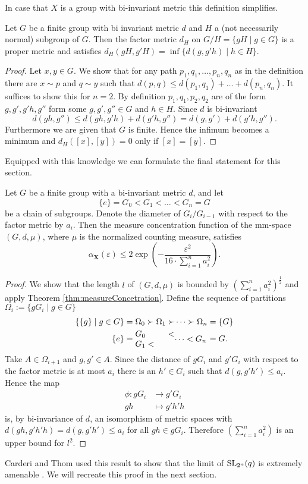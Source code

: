 In case that $X$ is a group with bi-invariant metric this definition simplifies.
\begin{lemma}\label{lem:factorMetric}
Let $G$ be a finite group with bi invariant metric $d$ and $H$ a (not necessarily normal) subgroup of $G$. Then the factor metric $d_H$ on $G/H=\{gH\mid g\in G\}$ is a proper metric and satisfies $d_H(gH,g'H)=\inf\{d(g,g'h)\mid h\in H\}$.
\end{lemma}
\begin{proof}
Let $x,y\in G$. We show that for any path $p_1,q_1,\dots,p_n,q_n$ as in the definition there are $x\sim p$ and $q\sim y$ such that $d(p,q)\leq d(p_1,q_1)+\dots+d(p_n,q_n)$. It suffices to show this for $n=2$. 
By definition $p_1,q_1,p_2,q_2$ are of the form $g,g',g'h,g''$ form some $g,g',g''\in G$ and $h\in H$. Since $d$ is bi-invariant 
\[d(gh,g'')\leq d(gh,g'h)+d(g'h,g'')=d(g,g')+d(g'h,g'').\]
Furthermore we are given that $G$ is finite. Hence the infimum becomes a minimum and $d_H([x],[y])=0$ only if $[x]=[y]$.
\end{proof}

Equipped with this knowledge we can formulate the final statement for this section. 
\begin{corollary}\label{cor:meaContractionGroups}
Let $G$ be a finite group with a bi-invariant metric $d$, and let
\[\{e\}=G_0<G_1<\dots <G_n=G\]
be a chain of subgroups. Denote the diameter of $G_i/G_{i-1}$ with respect to the factor metric by $a_i$. Then the measure concentration function of the mm-space $(G,d,\mu)$, where $\mu$ is the normalized counting measure, satisfies
\[\alpha_{\boldsymbol{X}}(\varepsilon)\leq 2\exp\left(-\frac{\varepsilon^2}{16\cdot\sum_{i=1}^{n}a_i^2}\right).\]
\end{corollary}
\begin{proof}
We show that the length $l$ of $(G,d,\mu)$ is bounded by $\left(\sum_{i=1}^{n}a_i^2\right)^{\frac{1}{2}}$ and apply Theorem \ref{thm:measureConcetration}. Define the sequence of partitions $\Omega_i:=\{g G_i\mid g\in G\}$
\begin{align*}
\{\{g\}\mid g\in G\}=\Omega_0\succ\Omega_1\succ&\dots\succ\Omega_n=\{G\}\\
\{e\}=\parbox{\widthof{$\Omega_0\succ\Omega_1\succ$}}{$G_0<G_1<$}&\parbox{\widthof{${}\dots\succ\Omega_n$}}{$\dots <G_n$}=G.
\end{align*}
Take $A\in \Omega_{i+1}$ and $g,g'\in A$. Since the distance of $gG_i$ and $g'G_i$ with respect to the factor metric is at most $a_i$ there is an $h'\in G_i$ such that $d(g,g'h')\leq a_i$. Hence the map 
\begin{align*}
\phi\colon g G_i&{}\to g'G_i\\
gh&{}\mapsto g'h'h
\end{align*}
is, by bi-invariance of $d$, an isomorphism of metric spaces with $d(gh,g'h'h)=d(g,g'h')\leq a_i$ for all $gh\in gG_i$.
Therefore $\left(\sum_{i=1}^{n}a_i^2\right)$ is an upper bound for $l^2$. 
\end{proof}
Carderi and Thom used this result to show that the limit of $\operatorname{SL}_{2^n}(q)$ is extremely amenable \cite{thom}. We will recreate this proof in the next section. 


